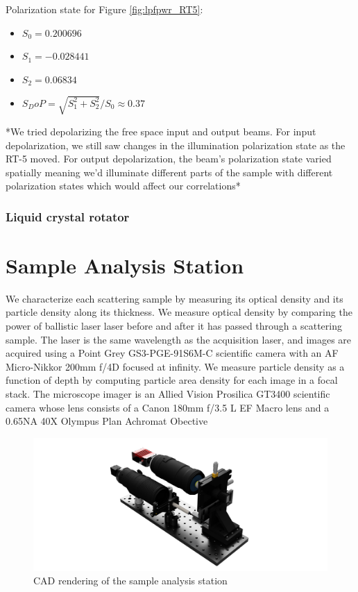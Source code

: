 Polarization state for Figure \ref{fig:lpfpwr_RT5}:
\begin{itemize}
    \item $S_0 = 0.200696$
    \item $S_1 = -0.028441$
    \item $S_2 = 0.06834$
    \item $S_DoP = \sqrt{S_1^2 + S_2^2}/S_0 \approx 0.37$
\end{itemize}

*We tried depolarizing the free space input and output beams. For input depolarization, we still saw changes in the illumination polarization state as the RT-5 moved. For output depolarization, the beam's polarization state varied spatially meaning we'd illuminate different parts of the sample with different polarization states which would affect our correlations*

\subsubsection{Liquid crystal rotator}

\section{Sample Analysis Station}
We characterize each scattering sample by measuring its optical density and its particle density along its thickness. We measure optical density by comparing the power of ballistic laser laser before and after it has passed through a scattering sample. The laser is the same wavelength as the acquisition laser, and images are acquired using a Point Grey GS3-PGE-91S6M-C scientific camera with an AF Micro-Nikkor 200mm f/4D focused at infinity. We measure particle density as a function of depth by computing particle area density for each image in a focal stack. The microscope imager is an Allied Vision Prosilica GT3400 scientific camera whose lens consists of a Canon 180mm f/3.5 L EF Macro lens and a 0.65NA 40X Olympus Plan Achromat Obective
\begin{figure}
    \centering
    \includegraphics[width=\linewidth]{../figures/SampleAnalysisStation.png}
    \caption{CAD rendering of the sample analysis station}
    \label{fig:sample_analysis_station}
\end{figure}

